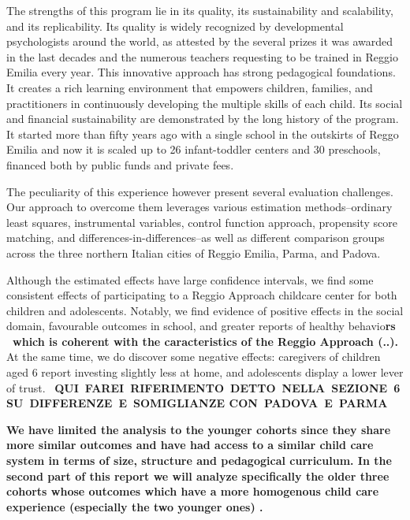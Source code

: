 \documentclass[12pt]{article}
\begin{document}
The strengths of this program lie in its quality, its sustainability and scalability, and its replicability. Its quality is widely recognized by developmental psychologists around the world, as attested by the several prizes it was awarded in the last decades and the numerous teachers requesting to be trained in Reggio Emilia every year. This innovative approach has strong pedagogical foundations. It creates a rich learning environment that empowers children, families, and practitioners in continuously developing the multiple skills of each child. Its social and financial sustainability are demonstrated by the long history of the program. It started more than fifty years ago with a single school in the outskirts of Reggo Emilia and now it is scaled up to 26 infant-toddler centers and 30 preschools, financed both by public funds and private fees.

The peculiarity of this experience however present several evaluation challenges. Our approach to overcome them leverages various estimation methods--ordinary least squares, instrumental variables, control function approach, propensity score matching, and differences-in-differences--as well as different comparison groups across the three northern Italian cities of Reggio Emilia, Parma, and Padova.

Although the estimated effects have large confidence intervals, we find some consistent effects of participating to a Reggio Approach childcare center for both children and adolescents. Notably, we find evidence of positive effects in the social domain, favourable outcomes in school, and greater reports of healthy behavio\textbf{rs \ which is coherent with the caracteristics of the Reggio Approach (..).}  At the same time, we do discover some negative effects: caregivers of children aged 6 report investing slightly less at home, and adolescents display a lower lever of trust. \ \textbf{QUI\ FAREI\ RIFERIMENTO\ DETTO\ NELLA\ SEZIONE\ 6 SU\ DIFFERENZE\ E\ SOMIGLIANZE CON\ PADOVA\ E\ PARMA}

\textbf{We have limited the analysis to the younger cohorts since they share more similar outcomes and have had access to a similar child care system in terms of size, structure and pedagogical curriculum. In the second part of this report we will analyze specifically the older three cohorts whose outcomes which have a more homogenous child care experience (especially the two younger ones) .}












\pagebreak 


\end{document}
